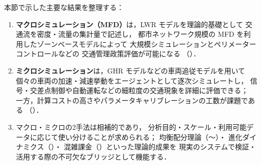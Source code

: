 本節で示した主要な結果を整理する：
\begin{enumerate}
  \item \textbf{マクロシミュレーション（MFD）}は，LWR モデルを理論的基礎として
        交通流を密度・流量の集計量で記述し，
        都市ネットワーク規模の MFD を利用したゾーンベースモデルによって
        大規模シミュレーションとペリメーターコントロールなどの
        交通管理政策評価が可能になる
        （）．
  \item \textbf{ミクロシミュレーション}は，GHR モデルなどの車両追従モデルを用いて
        個々の車両の加速・減速挙動をエージェントとして逐次シミュレートし，
        信号・交差点制御や自動運転などの細粒度の交通現象を詳細に評価できる；
        一方，計算コストの高さやパラメータキャリブレーションの工数が課題である
        （）．
  \item マクロ・ミクロの2手法は相補的であり，
        分析目的・スケール・利用可能データに応じて使い分けることが求められる；
        均衡配分理論（〜）・
        進化ダイナミクス（）・
        混雑課金（）といった理論的成果を
        現実のシステムで検証・活用する際の不可欠なブリッジとして機能する．
\end{enumerate}
